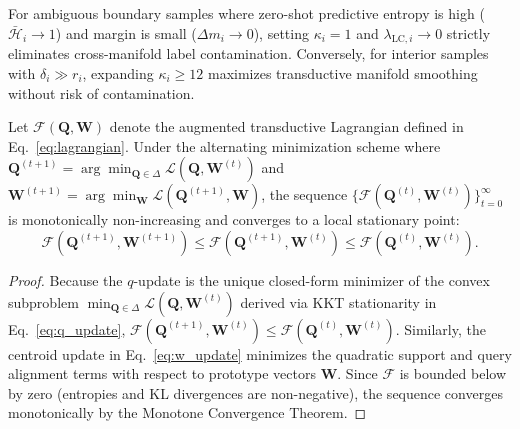 \begin{corollary}
\label{cor:optimal_k}
For ambiguous boundary samples where zero-shot predictive entropy is high ($\bar{\mathcal{H}}_i \to 1$) and margin is small ($\Delta m_i \to 0$), setting $\kappa_i = 1$ and $\lambda_{\text{LC}, i} \to 0$ strictly eliminates cross-manifold label contamination. Conversely, for interior samples with $\delta_i \gg r_i$, expanding $\kappa_i \ge 12$ maximizes transductive manifold smoothing without risk of contamination.
\end{corollary}

\begin{theorem}
\label{thm:adm_convergence}
Let $\mathcal{F}(\mathbf{Q}, \mathbf{W})$ denote the augmented transductive Lagrangian defined in Eq.~\eqref{eq:lagrangian}. Under the alternating minimization scheme where $\mathbf{Q}^{(t+1)} = \arg\min_{\mathbf{Q} \in \Delta} \mathcal{L}(\mathbf{Q}, \mathbf{W}^{(t)})$ and $\mathbf{W}^{(t+1)} = \arg\min_{\mathbf{W}} \mathcal{L}(\mathbf{Q}^{(t+1)}, \mathbf{W})$, the sequence $\{\mathcal{F}(\mathbf{Q}^{(t)}, \mathbf{W}^{(t)})\}_{t=0}^\infty$ is monotonically non-increasing and converges to a local stationary point:
\begin{equation}
    \mathcal{F}(\mathbf{Q}^{(t+1)}, \mathbf{W}^{(t+1)}) \le \mathcal{F}(\mathbf{Q}^{(t+1)}, \mathbf{W}^{(t)}) \le \mathcal{F}(\mathbf{Q}^{(t)}, \mathbf{W}^{(t)}).
\end{equation}
\end{theorem}

\begin{proof}
Because the $q$-update is the unique closed-form minimizer of the convex subproblem $\min_{\mathbf{Q} \in \Delta} \mathcal{L}(\mathbf{Q}, \mathbf{W}^{(t)})$ derived via KKT stationarity in Eq.~\eqref{eq:q_update}, $\mathcal{F}(\mathbf{Q}^{(t+1)}, \mathbf{W}^{(t)}) \le \mathcal{F}(\mathbf{Q}^{(t)}, \mathbf{W}^{(t)}).$ Similarly, the centroid update in Eq.~\eqref{eq:w_update} minimizes the quadratic support and query alignment terms with respect to prototype vectors $\mathbf{W}$. Since $\mathcal{F}$ is bounded below by zero (entropies and KL divergences are non-negative), the sequence converges monotonically by the Monotone Convergence Theorem.
\end{proof}

